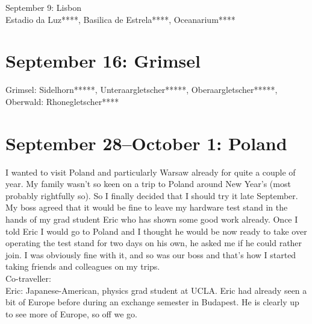 September 9: Lisbon\\
Estadio da Luz****, Basilica de Estrela****, Oceanarium****

\section{September 16: Grimsel}
\label{Grimsel2012}

Grimsel: Sidelhorn*****, Unteraargletscher*****, Oberaargletscher*****,
Oberwald: Rhonegletscher****

\section{September 28--October 1: Poland}
\label{Poland2012}

I wanted to visit Poland and particularly Warsaw already for quite a couple of year. My family wasn't so keen on a trip to Poland around New Year's (most probably rightfully so). So I finally decided that I should try it late September. My boss agreed that it would be fine to leave my hardware test stand in the hands of my grad student Eric who has shown some good work already. Once I told Eric I would go to Poland and I thought he would be now ready to take over operating the test stand for two days on his own, he asked me if he could rather join. I was obviously fine with it, and so was our boss and that's how I started taking friends and colleagues on my trips.\\

Co-traveller:\\
Eric: Japanese-American, physics grad student at UCLA. Eric had already seen a bit of Europe before during an exchange semester in Budapest. He is clearly up to see more of Europe, so off we go.\\

